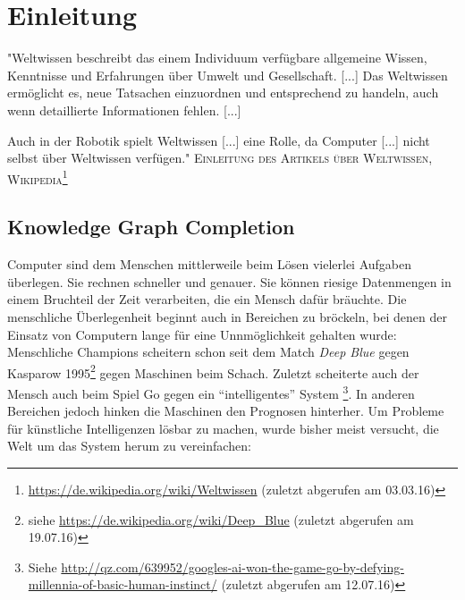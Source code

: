 
\chapter{Einleitung} %

\label{Chapter1} %


\newcommand{\keyword}[1]{\textbf{#1}}
\newcommand{\tabhead}[1]{\textbf{#1}}
\newcommand{\code}[1]{\texttt{#1}}
\newcommand{\file}[1]{\texttt{\bfseries#1}}
\newcommand{\option}[1]{\texttt{\itshape#1}}


\begin{itquote}
"Weltwissen beschreibt das einem Individuum verfügbare allgemeine Wissen, Kenntnisse und Erfahrungen über Umwelt und Gesellschaft. [...]
Das Weltwissen ermöglicht es, neue Tatsachen einzuordnen und entsprechend zu handeln, auch wenn detaillierte Informationen fehlen. [...]

Auch in der Robotik spielt Weltwissen [...] eine Rolle,
da Computer [...] nicht selbst über Weltwissen verfügen."
\flushright
\textsc{Einleitung des Artikels über Weltwissen, Wikipedia\footnote{\url{https://de.wikipedia.org/wiki/Weltwissen} (zuletzt abgerufen am 03.03.16)}}
\end{itquote}

\section{Knowledge Graph Completion}

Computer sind dem Menschen mittlerweile beim Lösen vielerlei Aufgaben überlegen. Sie rechnen schneller und genauer.
Sie können riesige Datenmengen in einem Bruchteil der Zeit verarbeiten, die ein Mensch dafür bräuchte. Die menschliche
Überlegenheit beginnt auch in Bereichen zu bröckeln, bei denen der Einsatz von Computern lange für eine Unnmöglichkeit
gehalten wurde: Menschliche Champions scheitern schon seit dem Match \emph{Deep Blue} gegen Kasparow 1995\footnote{
siehe \url{https://de.wikipedia.org/wiki/Deep_Blue} (zuletzt abgerufen am 19.07.16)} gegen Maschinen beim Schach. Zuletzt
scheiterte auch der Mensch auch beim Spiel Go gegen ein ``intelligentes'' System
\footnote{Siehe \url{http://qz.com/639952/googles-ai-won-the-game-go-by-defying-millennia-of-basic-human-instinct/} (zuletzt abgerufen am 12.07.16)}.
In anderen Bereichen jedoch hinken die Maschinen den Prognosen hinterher. Um Probleme
für künstliche Intelligenzen lösbar zu machen, wurde bisher meist versucht, die Welt um das System herum zu vereinfachen:\\

